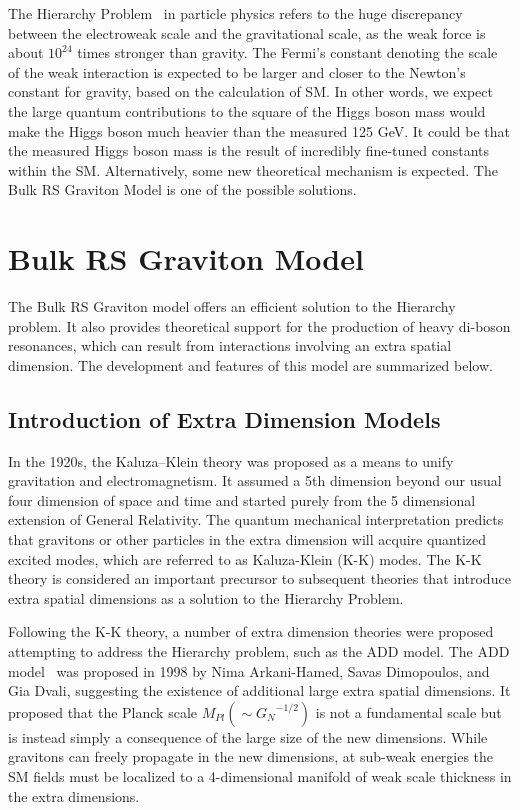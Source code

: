\vspace{0.3cm}
The Hierarchy Problem~\cite{intro_hierarchy} in particle physics refers to the huge discrepancy between the electroweak scale and the gravitational scale, as the weak force is about $10^{24}$ times stronger than gravity. The Fermi's constant denoting the scale of the weak interaction is expected to be larger and closer to the Newton's constant for gravity, based on the calculation of SM. In other words, we expect the large quantum contributions to the square of the Higgs boson mass would make the Higgs boson much heavier than the measured 125 GeV. It could be that the measured Higgs boson mass is the result of incredibly fine-tuned constants within the SM. Alternatively, some new theoretical mechanism is expected. The Bulk RS Graviton Model is one of the possible solutions.

\section{Bulk RS Graviton Model}
The Bulk RS Graviton model offers an efficient solution to the Hierarchy problem. It also provides theoretical support for the production of heavy di-boson resonances, which can result from interactions involving an extra spatial dimension. The development and features of this model are summarized below.
\subsection{Introduction of Extra Dimension Models}
In the 1920s, the Kaluza–Klein theory was proposed as a means to unify gravitation and electromagnetism. It assumed a 5th dimension beyond our usual four dimension of space and time and started purely from the 5 dimensional extension of General Relativity. The quantum mechanical interpretation predicts that gravitons or other particles in the extra dimension will acquire quantized excited modes, which are referred to as Kaluza-Klein (K-K) modes. The K-K theory is considered an important precursor to subsequent theories that introduce extra spatial dimensions as a solution to the Hierarchy Problem.

\vspace{0.3cm}
Following the K-K theory, a number of extra dimension theories were proposed attempting to address the Hierarchy problem, such as the ADD model. The ADD model~\cite{Intro_ADD,Intro_ADD2} was proposed in 1998 by Nima Arkani-Hamed, Savas Dimopoulos, and Gia Dvali, suggesting the existence of additional large extra spatial dimensions. It proposed that the Planck scale $M_{Pl}(\sim{G_{N}}^{-1/2})$ is not a fundamental scale but is instead simply a consequence of the large size of the new dimensions. While gravitons can freely propagate in the new dimensions, at sub-weak energies the SM fields must be localized to a 4-dimensional manifold of weak scale thickness in the extra dimensions. 

